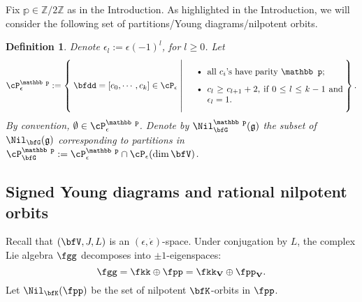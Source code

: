 \documentclass[12pt,a4paper]{amsart}
\newcommand{\g}{\mathfrak g}
\newcommand{\Z}{\mathbb{Z}}
\def\DD{\nabla}
\numberwithin{equation}{section}
\newtheorem{defn}[thm]{Definition}
\theoremstyle{remark}
\begin{document}
Fix $\mathbb p\in \Z/2\Z$ as in the Introduction. As highlighted in the Introduction, we will  consider the following set of partitions/Young diagrams/nilpotent orbits.

\begin{defn}\label{def:c} Denote $\epsilon_l := \epsilon (-1)^{l}$, for $l\geq 0$. Let
\[
\cP^{\mathbb p}_{\epsilon}:= \Set{\bfdd = [c_0,\cdots, c_k]\in
  \cP_{\epsilon}|  \parbox[c]{18em}{
    \begin{itemize}
    \item all $c_i$'s have parity $\mathbb p$;
    \item $c_{l} \geq c_{l+1} + 2$, if $0\leq l\leq k-1$ and $\epsilon_l = 1$.
        \end{itemize}}
}.
\]
By convention, $\emptyset \in \cP^{\mathbb p}_{\epsilon}$.
Denote by $\Nil^{\mathbb p}_{\bfG}(\g)$ the subset of $\Nil_{\bfG}(\g)$ corresponding to
partitions in $\cP^{\mathbb p}_{\bfG}:=\cP^{\mathbb p}_{\epsilon}\cap  \cP_{\epsilon}(\dim \bfV)$.
\end{defn}




\subsection{Signed Young diagrams and rational nilpotent orbits}\label{subsec:SYD}
Recall that $(\bfV, J,L)$ is an
$(\epsilon, \dot \epsilon)$-space. %
Under conjugation by $L$, the complex Lie algebra $\fgg$ decomposes into
$\pm 1$-eigenspaces:
\begin{equation}\label{eq:k+p}
\fgg  = \fkk\oplus \fpp=\fkk_{\bf V} \oplus \fpp_{\bf V}.
\end{equation}
Let  $\Nil_{\bfK}(\fpp)$ be the set of nilpotent $\bfK$-orbits in
$\fpp$.
\end{document}
